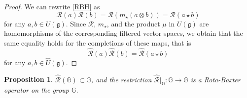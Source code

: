\documentclass[12pt]{amsart}
\newtheorem{pro}[thm]{Proposition}
\theoremstyle{definition}   %
\newcommand{\g}{\mathfrak g}
\newcommand{\G}{\mathbb G}
\newcommand{\huaR}{\mathcal{R}}
\newcommand{\huaF}{\mathcal{F}}
\newcommand{\Id}{{\rm{Id}}}
\newcommand{\fVec}{\mathsf{fVect}}
\newcommand{\cVec}{\mathsf{cVect}}
\begin{document}
\begin{proof} We can rewrite \eqref{RBH} as
$$
\huaR(a)\huaR(b)=\huaR(m_{\star}(a\otimes b))=\huaR(a\star b)
$$
for any $a,b\in U(\g)$. Since $\huaR$, $m_{\star}$, and the product $\mu $ in $U(\g)$ are homomorphisms of the corresponding filtered vector spaces, we obtain that the same equality holds for the completions of these maps, that is
$$
\widehat{\huaR}(a)\widehat{\huaR}(b)=\widehat{\huaR}(a\star b)
$$
for any $a,b\in \widehat{U}(\g)$.
\end{proof}


\begin{pro}\label{pro:RBgrouplike}
$\widehat{\huaR} (\G)\subset \G$, and the restriction $\widehat{\huaR}|_\G:\G\rightarrow \G$ is a Rota-Baxter operator on the group $\G$.
\end{pro}
\end{document}
